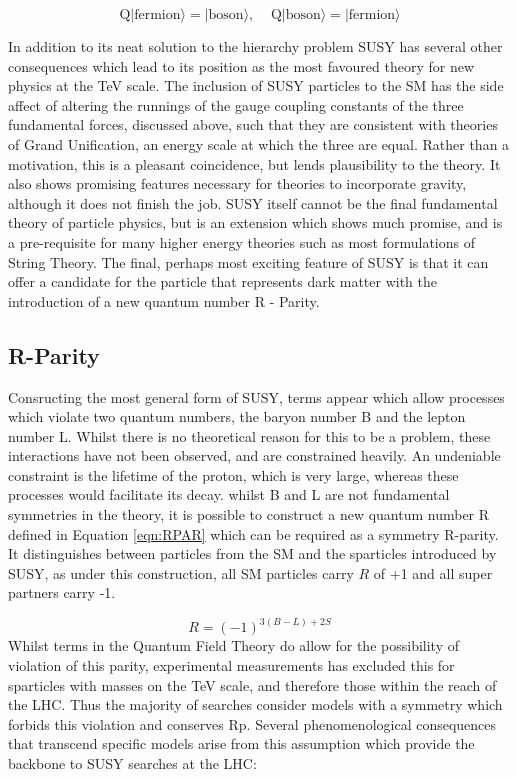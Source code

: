 \begin{equation}
\textrm{Q}|\textrm{fermion}\rangle = |\textrm{boson}\rangle,  \; \; \; \;  \textrm{Q}|\textrm{boson}\rangle = |\textrm{fermion}\rangle  
\label{eqn:Q}
\end{equation}


In addition to its neat solution to the hierarchy problem SUSY has several other consequences which lead to its position as the most favoured theory for new physics at the TeV scale. The inclusion of SUSY particles to the SM has the side affect of altering the runnings of the gauge coupling constants of the three fundamental forces, discussed above, such that they are consistent with theories of Grand Unification, an energy scale at which the three are equal. Rather than a motivation, this is a pleasant coincidence, but lends plausibility to the theory. It also shows promising features necessary for theories to incorporate gravity, although it does not finish the job. SUSY itself cannot be the final fundamental theory of particle physics, but is an extension which shows much promise, and is a pre-requisite for many higher energy theories such as most formulations of String Theory\cite{Dine}. The final, perhaps most exciting feature of SUSY is that it can offer a candidate for the particle that represents dark matter with the introduction of a new quantum number R - Parity. 



\subsection{R-Parity}

Consructing the most general form of SUSY, terms appear which allow processes which violate two quantum numbers, the baryon number B and the lepton number L. Whilst there is no theoretical reason for this to be a problem, these interactions have not been observed, and are constrained heavily. An undeniable constraint is the lifetime of the proton, which is very large, whereas these processes would facilitate its decay. whilst B and L are not fundamental symmetries in the theory, it is possible to construct a new quantum number R defined in Equation \ref{eqn:RPAR} which can be required as a symmetry R-parity. It distinguishes between particles from the SM and the sparticles introduced by SUSY, as under this construction, all SM particles carry $R$ of +1 and all super partners carry -1. 

\begin{equation}
R = (-1)^{3(B-L)+2S}
\label{eqn:RPAR}
\end{equation}
Whilst terms in the Quantum Field Theory do allow for the possibility of violation of this parity, experimental measurements has excluded this for sparticles with masses on the TeV scale, and therefore those within the reach of the LHC. Thus the  majority of searches consider models with a symmetry which forbids this violation and conserves Rp. Several phenomenological consequences that transcend specific models arise from this assumption which provide the backbone to SUSY searches at the LHC:

